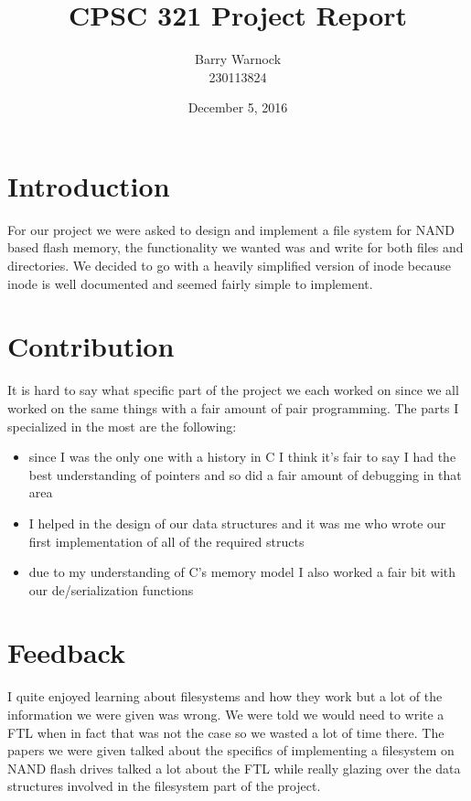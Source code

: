 \documentclass{article}
\begin{document}
\title{CPSC 321 Project Report}
\author{Barry Warnock\\
  230113824}
\date{December 5, 2016}
\maketitle


\section*{Introduction}
For our project we were asked to design and implement a file system for NAND based flash memory, the functionality we wanted was and write for
both files and directories. We decided to go with a heavily simplified version of inode because inode is well documented and seemed fairly simple to
implement.

\section*{Contribution}
It is hard to say what specific part of the project we each worked on since we all worked on the same things with a fair amount of pair programming.
The parts I specialized in the most are the following:
\begin{itemize}
\item since I was the only one with a history in C I think it's fair to say I had the best understanding of pointers and so did a fair amount
  of debugging in that area
\item I helped in the design of our data structures and it was me who wrote our first implementation of all of the required structs
\item due to my understanding of C's memory model I also worked a fair bit with our de/serialization functions
\end{itemize}

\section*{Feedback}
I quite enjoyed learning about filesystems and how they work but a lot of the information we were given was wrong. We were told we would need to
write a FTL when in fact that was not the case so we wasted a lot of time there. The papers we were given talked about the specifics
of implementing a filesystem on NAND flash drives talked a lot about the FTL while really glazing over the data structures involved in
the filesystem part of the project.
\end{document}
